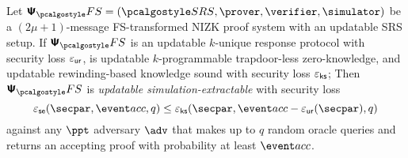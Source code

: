 
\begin{theorem}
	\label{thm:se}
	Let $\psfs = (\SRScer, \prover, \verifier, \simulator)$ be a  $(2\mu + 1)$-message FS-transformed NIZK proof system with an updatable SRS setup. If $\psfs$ is an
	updatable $k$-unique response protocol with security loss $\varepsilon_{\mathsf{ur}}$, is
	updatable $k$-programmable trapdoor-less zero-knowledge, and %
	updatable rewinding-based knowledge sound with security loss $\varepsilon_{\mathsf{ks}}$; 
	Then $\psfs$ is \emph{updatable simulation-extractable} with security loss $$\epsse(\secpar,\accProb,q) \leq \epscss(\secpar,\accProb - \epsur(\secpar),q)$$ against any $\ppt$ adversary $\advse$ that makes up to $q$ random oracle queries and returns an accepting proof with probability at least $\accProb$.
\end{theorem}

